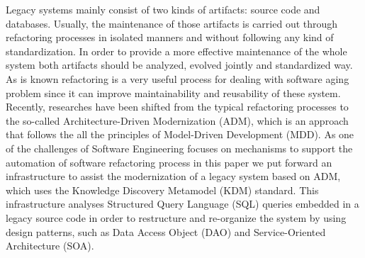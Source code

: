 Legacy systems mainly consist of two kinds of artifacts: source code and databases. Usually, the maintenance of those artifacts is carried out through refactoring processes in isolated manners and without following any kind of standardization. In order to provide a more effective maintenance of the whole system both artifacts should be analyzed, evolved jointly and standardized way. As is known refactoring is a very useful process for dealing with software aging problem since it can improve maintainability and reusability of these system. Recently, researches have been shifted from the typical refactoring processes to the so-called Architecture-Driven Modernization (ADM), which is an approach that follows the all the principles of Model-Driven Development (MDD). As one of the challenges of Software Engineering focuses on mechanisms to support the automation of software refactoring process in this paper we put forward an infrastructure to assist the modernization of a legacy system based on ADM, which uses the Knowledge Discovery Metamodel (KDM) standard. This infrastructure analyses Structured Query Language (SQL) queries embedded in a legacy source code in order to restructure and re-organize the system by using design patterns, such as Data Access Object (DAO) and Service-Oriented Architecture (SOA). 